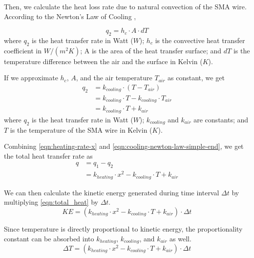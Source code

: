 Then, we calculate the heat loss rate due to natural convection of the SMA wire. According to the Newton's Law of Cooling \cite{NewtonLawOfCooling}, 

\begin{equation}\label{eqn:cooling-newton-law}
q_2 = h_c \cdot A \cdot dT
\end{equation}
where $q_2$ is the heat transfer rate in Watt ($W$); $h_c$ is the convective heat transfer coefficient in $W/(m^2K)$; A is the area of the heat transfer surface; and $dT$ is the temperature difference between the air and the surface in Kelvin ($K$).

If we approximate $h_c$, $A$, and the air temperature $T_{air}$ as constant, we get
\begin{subequations}\label{eqn:cooling-newton-law-simple}
	\begin{flalign}
		q_2 &= k_{cooling} \cdot (T - T_{air}) \\
			&= k_{cooling} \cdot T - k_{cooling} \cdot T_{air} \\
			&= k_{cooling} \cdot T + k_{air}\label{eqn:cooling-newton-law-simple-end}
	\end{flalign}
\end{subequations}
where $q_2$ is the heat transfer rate in Watt ($W$); $k_{cooling}$ and $k_{air}$ are constants; and $T$ is the temperature of the SMA wire in Kelvin ($K$).

Combining \eqref{eqn:heating-rate-x} and \eqref{eqn:cooling-newton-law-simple-end}, we get the total heat transfer rate as 
\begin{subequations}
	\begin{flalign}
		q &= q_1 - q_2 \\
		  &= k_{heating} \cdot x^2 - k_{cooling} \cdot T + k_{air}\label{eqn:total_heat}
	\end{flalign}
\end{subequations}

We can then calculate the kinetic energy generated  during time interval $\Delta t$ by multiplying \eqref{eqn:total_heat} by $\Delta t$.
\begin{equation}
	KE =  (k_{heating} \cdot x^2 - k_{cooling} \cdot T + k_{air}) \cdot \Delta t \label{eqn:total_KE}
\end{equation}

Since temperature is directly proportional to kinetic energy, the proportionality constant can be absorbed into $k_{heating}$, $k_{cooling}$, and $ k_{air}$ as well. 
\begin{equation}
	\Delta T =  (k_{heating} \cdot x^2 - k_{cooling} \cdot T  + k_{air}) \cdot \Delta t\label{eqn:delta_T}
\end{equation}


